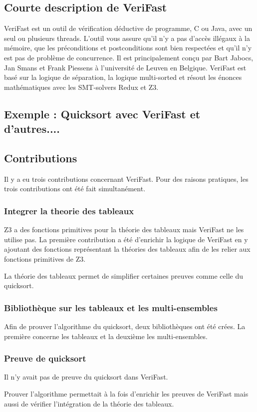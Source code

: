 \documentclass[9pt]{book}
\newcommand{\verifast}{VeriFast}
\begin{document}
		\subsection*{Courte description de \verifast{}}
			\verifast{} est un outil de v\'erification d\'eductive de programme, C ou Java, avec un seul ou plusieurs threads. L'outil vous assure qu'il n'y a pas d'acc\`es ill\'egaux \`a la m\'emoire, que les pr\'econditions et postconditions sont bien respect\'ees et qu'il n'y est pas de probl\`eme de concurrence. Il est principalement con\c{c}u par Bart Jabocs, Jan Smans et Frank Piessens \`a l'universit\'e de Leuven en Belgique. \verifast{} est bas\'e sur la logique de s\'eparation, la logique multi-sorted et r\'esout les \'enonces math\'ematiques avec les SMT-solvers Redux et Z3.
		\subsection*{Exemple : Quicksort avec \verifast{} et d'autres....}
		\subsection*{Contributions}
		Il y a eu trois contributions concernant \verifast{}. Pour des raisons pratiques, les trois contributions ont \'et\'e fait simultan\'ement.
			\subsubsection{Integrer la theorie des tableaux}
				Z3 a des fonctions primitives pour la th\'eorie des tableaux mais \verifast{} ne les utilise pas. La premi\`ere contribution a \'et\'e d'enrichir la logique de \verifast{} en y ajoutant des fonctions repr\'esentant la th\'eories des tableaux afin de les relier aux fonctions primitives de Z3. \par
				La th\'eorie des tableaux permet de simplifier certaines preuves comme celle du quicksort.
			\subsubsection{Biblioth\`eque sur les tableaux et les multi-ensembles}
			Afin de prouver l'algorithme du quicksort, deux biblioth\`eques ont \'et\'e cr\'ees. La premi\`ere concerne les tableaux et la deuxi\`eme les multi-ensembles.

			\subsubsection{Preuve de quicksort}
			Il n'y avait pas de preuve du quicksort dans \verifast{}. \par Prouver l'algorithme permettait \`a la fois d'enrichir les preuves de \verifast{} mais aussi de v\'erifier l'int\'egration de la th\'eorie des tableaux.
\end{document}
